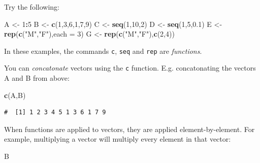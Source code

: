 \documentclass[
  a4paperpaper,
]{book}
\newenvironment{Shaded}{\begin{snugshade}}{\end{snugshade}}
\newcommand{\DataTypeTok}[1]{\textcolor[rgb]{0.13,0.29,0.53}{#1}}
\newcommand{\DecValTok}[1]{\textcolor[rgb]{0.00,0.00,0.81}{#1}}
\newcommand{\FloatTok}[1]{\textcolor[rgb]{0.00,0.00,0.81}{#1}}
\newcommand{\KeywordTok}[1]{\textcolor[rgb]{0.13,0.29,0.53}{\textbf{#1}}}
\newcommand{\NormalTok}[1]{#1}
\newcommand{\OperatorTok}[1]{\textcolor[rgb]{0.81,0.36,0.00}{\textbf{#1}}}
\newcommand{\StringTok}[1]{\textcolor[rgb]{0.31,0.60,0.02}{#1}}
\begin{document}
Try the following:

\begin{Shaded}
\begin{Highlighting}[]
\NormalTok{A \textless{}{-}}\StringTok{ }\DecValTok{1}\OperatorTok{:}\DecValTok{5}
\NormalTok{B \textless{}{-}}\StringTok{ }\KeywordTok{c}\NormalTok{(}\DecValTok{1}\NormalTok{,}\DecValTok{3}\NormalTok{,}\DecValTok{6}\NormalTok{,}\DecValTok{1}\NormalTok{,}\DecValTok{7}\NormalTok{,}\DecValTok{9}\NormalTok{)}
\NormalTok{C \textless{}{-}}\StringTok{ }\KeywordTok{seq}\NormalTok{(}\DecValTok{1}\NormalTok{,}\DecValTok{10}\NormalTok{,}\DecValTok{2}\NormalTok{)}
\NormalTok{D \textless{}{-}}\StringTok{ }\KeywordTok{seq}\NormalTok{(}\DecValTok{1}\NormalTok{,}\DecValTok{5}\NormalTok{,}\FloatTok{0.1}\NormalTok{)}
\NormalTok{E \textless{}{-}}\StringTok{ }\KeywordTok{rep}\NormalTok{(}\KeywordTok{c}\NormalTok{(}\StringTok{"M"}\NormalTok{,}\StringTok{"F"}\NormalTok{),}\DataTypeTok{each =} \DecValTok{3}\NormalTok{)}
\NormalTok{G \textless{}{-}}\StringTok{ }\KeywordTok{rep}\NormalTok{(}\KeywordTok{c}\NormalTok{(}\StringTok{"M"}\NormalTok{,}\StringTok{"F"}\NormalTok{),}\KeywordTok{c}\NormalTok{(}\DecValTok{2}\NormalTok{,}\DecValTok{4}\NormalTok{))}
\end{Highlighting}
\end{Shaded}

In these examples, the commands \texttt{c}, \texttt{seq} and \texttt{rep} are \emph{functions}.

You can \emph{concatonate} vectors using the \texttt{c} function. E.g. concatonating the vectors A and B from above:

\begin{Shaded}
\begin{Highlighting}[]
\KeywordTok{c}\NormalTok{(A,B)  }
\end{Highlighting}
\end{Shaded}

\begin{verbatim}
#  [1] 1 2 3 4 5 1 3 6 1 7 9
\end{verbatim}

When functions are applied to vectors, they are applied element-by-element. For example, multiplying a vector will multiply every element in that vector:

\begin{Shaded}
\begin{Highlighting}[]
\NormalTok{B}
\end{Highlighting}
\end{Shaded}
\end{document}
